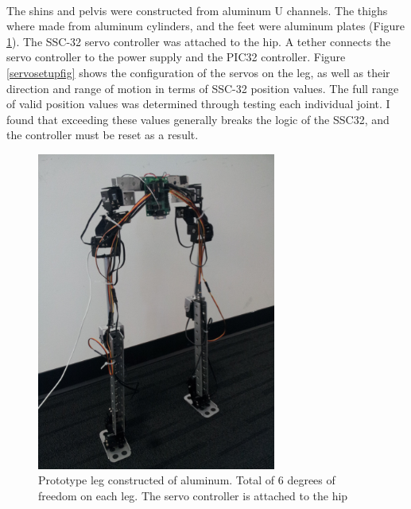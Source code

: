 \documentclass[titlepage,letterpaper,12pt]{article}
\begin{document}
\paragraph{}The shins and pelvis were constructed from aluminum U channels. The
thighs where made from aluminum cylinders, and the feet were aluminum plates
(Figure \ref{protolegfig}). The SSC-32 servo controller was attached to the hip.
A tether connects the servo controller to the power supply and the PIC32
controller. Figure \ref{servosetupfig} shows the configuration of the servos on
the leg, as well as their direction and range of motion in terms of SSC-32
position values. The full range of valid position values was determined through
testing each individual joint. I found that exceeding these values generally
breaks the logic of the SSC32, and the controller must be reset as a result.

\begin{figure}
  \centering
    \includegraphics[width=0.7\textwidth,angle=270]{figures/LegPrototype.jpg}
  \caption{Prototype leg constructed of aluminum. Total of 6 degrees of freedom
  on each leg. The servo controller is attached to the hip}
  \label{protolegfig}
\end{figure}
\end{document}
